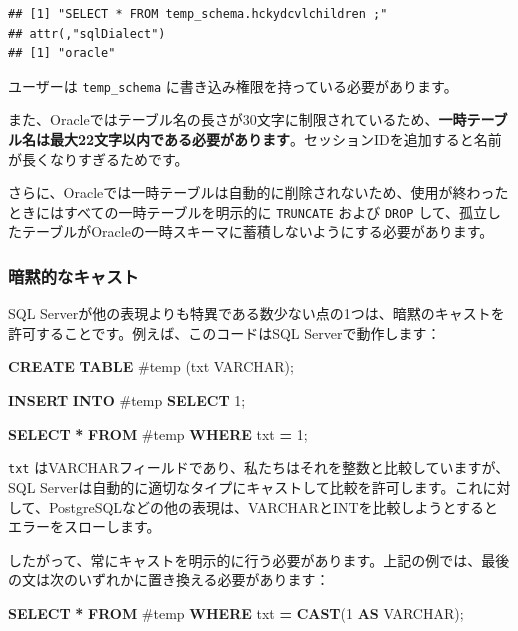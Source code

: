\documentclass[
  11pt]{book}
\newenvironment{Shaded}{\begin{snugshade}}{\end{snugshade}}
\newcommand{\DataTypeTok}[1]{\textcolor[rgb]{0.13,0.29,0.53}{#1}}
\newcommand{\DecValTok}[1]{\textcolor[rgb]{0.00,0.00,0.81}{#1}}
\newcommand{\FunctionTok}[1]{\textcolor[rgb]{0.13,0.29,0.53}{\textbf{#1}}}
\newcommand{\KeywordTok}[1]{\textcolor[rgb]{0.13,0.29,0.53}{\textbf{#1}}}
\newcommand{\NormalTok}[1]{#1}
\newcommand{\OperatorTok}[1]{\textcolor[rgb]{0.81,0.36,0.00}{\textbf{#1}}}
\newcommand{\StringTok}[1]{\textcolor[rgb]{0.31,0.60,0.02}{#1}}
\theoremstyle{definition}
\theoremstyle{definition}
\theoremstyle{definition}
\theoremstyle{definition}
\theoremstyle{remark}
\begin{document}
\begin{verbatim}
## [1] "SELECT * FROM temp_schema.hckydcvlchildren ;"
## attr(,"sqlDialect")
## [1] "oracle"
\end{verbatim}

ユーザーは \texttt{temp\_schema} に書き込み権限を持っている必要があります。

また、Oracleではテーブル名の長さが30文字に制限されているため、\textbf{一時テーブル名は最大22文字以内である必要があります}。セッションIDを追加すると名前が長くなりすぎるためです。

さらに、Oracleでは一時テーブルは自動的に削除されないため、使用が終わったときにはすべての一時テーブルを明示的に \texttt{TRUNCATE} および \texttt{DROP} して、孤立したテーブルがOracleの一時スキーマに蓄積しないようにする必要があります。

\subsubsection*{暗黙的なキャスト}\label{ux6697ux9ed9ux7684ux306aux30adux30e3ux30b9ux30c8}

SQL Serverが他の表現よりも特異である数少ない点の1つは、暗黙のキャストを許可することです。例えば、このコードはSQL Serverで動作します：

\begin{Shaded}
\begin{Highlighting}[]
\KeywordTok{CREATE} \KeywordTok{TABLE}\NormalTok{ \#temp (txt }\DataTypeTok{VARCHAR}\NormalTok{);}

\KeywordTok{INSERT} \KeywordTok{INTO}\NormalTok{ \#temp}
\KeywordTok{SELECT} \StringTok{\textquotesingle{}1\textquotesingle{}}\NormalTok{;}

\KeywordTok{SELECT} \OperatorTok{*} \KeywordTok{FROM}\NormalTok{ \#temp }\KeywordTok{WHERE}\NormalTok{ txt }\OperatorTok{=} \DecValTok{1}\NormalTok{;}
\end{Highlighting}
\end{Shaded}

\texttt{txt} はVARCHARフィールドであり、私たちはそれを整数と比較していますが、SQL Serverは自動的に適切なタイプにキャストして比較を許可します。これに対して、PostgreSQLなどの他の表現は、VARCHARとINTを比較しようとするとエラーをスローします。

したがって、常にキャストを明示的に行う必要があります。上記の例では、最後の文は次のいずれかに置き換える必要があります：

\begin{Shaded}
\begin{Highlighting}[]
\KeywordTok{SELECT} \OperatorTok{*} \KeywordTok{FROM}\NormalTok{ \#temp }\KeywordTok{WHERE}\NormalTok{ txt }\OperatorTok{=} \FunctionTok{CAST}\NormalTok{(}\DecValTok{1} \KeywordTok{AS} \DataTypeTok{VARCHAR}\NormalTok{);}
\end{Highlighting}
\end{Shaded}
\end{document}
